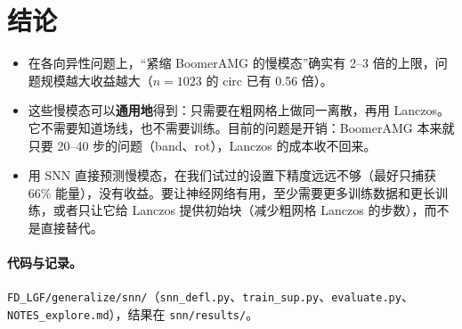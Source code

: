 \documentclass[11pt,a4paper]{ctexart}
\begin{document}
\section{结论}
\begin{itemize}
\item 在各向异性问题上，“紧缩 BoomerAMG 的慢模态”确实有 2--3 倍的上限，问题规模越大收益越大（$n=1023$ 的 circ 已有 0.56 倍）。
\item 这些慢模态可以\textbf{通用地}得到：只需要在粗网格上做同一离散，再用 Lanczos。它不需要知道场线，也不需要训练。目前的问题是开销：BoomerAMG 本来就只要 20--40 步的问题（band、rot），Lanczos 的成本收不回来。
\item 用 SNN 直接预测慢模态，在我们试过的设置下精度远远不够（最好只捕获 66\% 能量），没有收益。要让神经网络有用，至少需要更多训练数据和更长训练，或者只让它给 Lanczos 提供初始块（减少粗网格 Lanczos 的步数），而不是直接替代。
\end{itemize}
\paragraph{代码与记录。}\texttt{FD\_LGF/generalize/snn/}（\texttt{snn\_defl.py}、\texttt{train\_sup.py}、\texttt{evaluate.py}、\texttt{NOTES\_explore.md}），结果在 \texttt{snn/results/}。
\end{document}
